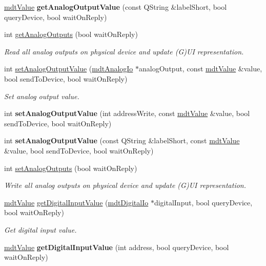 \begin{DoxyCompactItemize}
\item 
\hypertarget{classmdt_device_ad6bfbab4c93bc0136068e773dd776010}{
\hyperlink{classmdt_value}{mdtValue} {\bfseries getAnalogOutputValue} (const QString \&labelShort, bool queryDevice, bool waitOnReply)}
\label{classmdt_device_ad6bfbab4c93bc0136068e773dd776010}

\item 
int \hyperlink{classmdt_device_a78a8968cf61c1cac518b0a8af471110c}{getAnalogOutputs} (bool waitOnReply)
\begin{DoxyCompactList}\small\item\em Read all analog outputs on physical device and update (G)UI representation. \end{DoxyCompactList}\item 
int \hyperlink{classmdt_device_a766d9adcf8c2274f61f120a4a5c5c6d9}{setAnalogOutputValue} (\hyperlink{classmdt_analog_io}{mdtAnalogIo} $\ast$analogOutput, const \hyperlink{classmdt_value}{mdtValue} \&value, bool sendToDevice, bool waitOnReply)
\begin{DoxyCompactList}\small\item\em Set analog output value. \end{DoxyCompactList}\item 
\hypertarget{classmdt_device_ab605f81f28271f54570f151e94039807}{
int {\bfseries setAnalogOutputValue} (int addressWrite, const \hyperlink{classmdt_value}{mdtValue} \&value, bool sendToDevice, bool waitOnReply)}
\label{classmdt_device_ab605f81f28271f54570f151e94039807}

\item 
\hypertarget{classmdt_device_a40b49f882622c37f50a57132f954e732}{
int {\bfseries setAnalogOutputValue} (const QString \&labelShort, const \hyperlink{classmdt_value}{mdtValue} \&value, bool sendToDevice, bool waitOnReply)}
\label{classmdt_device_a40b49f882622c37f50a57132f954e732}

\item 
int \hyperlink{classmdt_device_a57e1cee7e670469035c57e3bd2ff4c9d}{setAnalogOutputs} (bool waitOnReply)
\begin{DoxyCompactList}\small\item\em Write all analog outputs on physical device and update (G)UI representation. \end{DoxyCompactList}\item 
\hyperlink{classmdt_value}{mdtValue} \hyperlink{classmdt_device_afe8bd7811ccc4a2ba8088edf073e0a8d}{getDigitalInputValue} (\hyperlink{classmdt_digital_io}{mdtDigitalIo} $\ast$digitalInput, bool queryDevice, bool waitOnReply)
\begin{DoxyCompactList}\small\item\em Get digital input value. \end{DoxyCompactList}\item 
\hypertarget{classmdt_device_a9915b677a307ffeab98a413d61b0f2e7}{
\hyperlink{classmdt_value}{mdtValue} {\bfseries getDigitalInputValue} (int address, bool queryDevice, bool waitOnReply)}
\label{classmdt_device_a9915b677a307ffeab98a413d61b0f2e7}


\end{DoxyCompactItemize}
